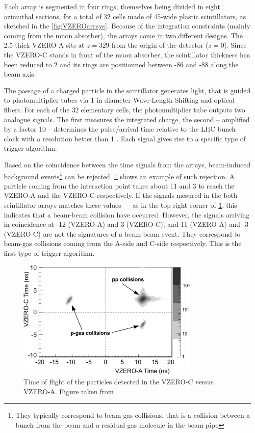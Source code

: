 Each array is segmented in four rings, themselves being divided in eight azimuthal sections, for a total of 32 cells made of 45\textdegree-wide plastic scintillators, as sketched in the \fig\ref{fig:VZEROarrays}. Because of the integration constraints (mainly coming from the muon absorber), the arrays come in two different designs. The 2.5-\cm thick VZERO-A sits at $z = 329$ \cm from the origin of the detector ($z = 0$). Since the VZERO-C stands in front of the muon absorber, the scintillator thickness has been reduced to 2 \cm and its rings are positionned between -86 and -88 \cm along the beam axis.

The passage of a charged particle in the scintillator generates light, that is guided to photomultiplier tubes via 1 \mm in diameter Wave-Length Shifting and optical fibers. For each of the 32 elementary cells, the photomultiplier tube outputs two analogue signals. The first measures the integrated charge, the second -- amplified by a factor 10 -- determines the pulse/arrival time relative to the LHC bunch clock with a resolution better than 1 \nsec. Each signal gives rise to a specific type of trigger algorithm. 

Based on the coincidence between the time signals from the arrays, beam-induced background events\footnote{They typically correspond to beam-gas collisions, that is a collision between a bunch from the beam and a residual gas molecule in the beam pipe} can be rejected. \Fig\ref{fig:VZERObeamgas} shows an example of such rejection. A particle coming from the interaction point takes about 11 \nsec and 3 \nsec to reach the VZERO-A and the VZERO-C respectively. If the signals mesured in the both scintillator arrays matches these values --- as in the top right corner of \fig\ref{fig:VZERObeamgas}, this indicates that a beam-beam collision have occurred. However, the signals arriving in coincidence at -12 \nsec (VZERO-A) and 3 \nsec (VZERO-C), and 11 \nsec (VZERO-A) and -3 \nsec (VZERO-C) are not the signatures of a beam-beam event. They correspond to beam-gas collisions coming from the A-side and C-side respectively. This is the first type of trigger algorithm.

\begin{figure}[t]
	\centering
	\includegraphics[width=0.8\textwidth]{Figs/Chapter3/Fig6_2-4228.png}
	\caption{Time of flight of the particles detected in the VZERO-C versus VZERO-A. Figure taken from \cite{alicecollaborationPerformanceALICEVZERO2013}.}
	\label{fig:VZERObeamgas}
\end{figure}


